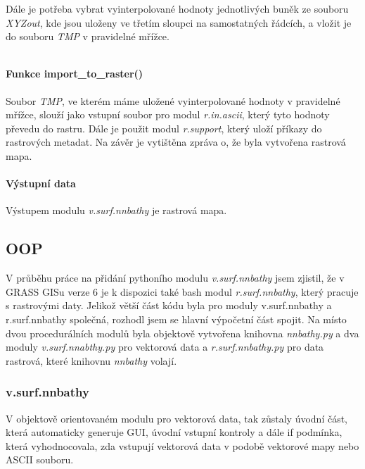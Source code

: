 \documentclass[12pt,a4paper]{article}
\begin{document}
Dále je potřeba vybrat vyinterpolované hodnoty jednotlivých buněk ze souboru \textit{XYZout}, kde jsou uloženy ve třetím sloupci na samostatných řádcích, a vložit je do souboru \textit{TMP} v pravidelné mřížce.

\begin{lstlisting}
\end{lstlisting}

\paragraph{Funkce import\_to\_raster()}
Soubor \textit{TMP}, ve kterém máme uložené vyinterpolované hodnoty v pravidelné mřížce, slouží jako vstupní soubor pro modul \textit{r.in.ascii}, který tyto hodnoty převedu do rastru. Dále je použit modul \textit{r.support}, který uloží příkazy do rastrových metadat. Na závěr je vytištěna zpráva o, že byla vytvořena rastrová mapa.


\paragraph{Výstupní data}
Výstupem modulu \textit{v.surf.nnbathy} je rastrová mapa.

\newpage
\subsection{OOP}
V průběhu práce na přidání pythoního modulu \textit{v.surf.nnbathy} jsem zjistil, že v GRASS GISu verze 6 je k dispozici také bash modul \textit{r.surf.nnbathy}, který pracuje s rastrovými daty. Jelikož větší část kódu byla pro moduly v.surf.nnbathy a r.surf.nnbathy společná, rozhodl jsem se hlavní výpočetní část spojit. Na místo dvou procedurálních modulů byla objektově vytvořena knihovna \textit{nnbathy.py} a dva moduly \textit{v.surf.nnabthy.py} pro vektorová data a \textit{r.surf.nnbathy.py} pro data rastrová, které knihovnu \textit{nnbathy} volají.

\subsubsection{v.surf.nnbathy}
V objektově orientovaném modulu pro vektorová data, tak zůstaly úvodní část, která automaticky generuje GUI, úvodní vstupní kontroly a dále if podmínka, která vyhodnocovala, zda vstupují vektorová data v podobě vektorové mapy nebo ASCII souboru.
\end{document}
